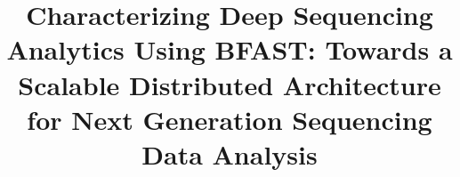 \documentclass{acm_proc_article-sp}
\begin{document}

\newif\ifdraft
\drafttrue                                                                                                   

\ifdraft
 \newcommand{\rananote}[1]{ {\textcolor{blue}    { ***Omer:     #1 }}}
 \newcommand{\jkimnote}[1]{{\textcolor{green}   { ***Joohyun:   #1 }}}
 \newcommand{\jhanote}[1]{  {\textcolor{red}     { ***SJ: #1 }}}
  \newcommand{\smnote}[1]{  {\textcolor{blue}     { ***sharath: #1 }}}
 \newcommand{\todo}[1]{  {\textcolor{red}     { ***TODO: #1 }}}
 \newcommand{\fix}[1]{  {\textcolor{red}     { ***FIX: #1 }}}

\else
 \newcommand{\rananote}[1]{}
 \newcommand{\jkimnote}[1]{}
 \newcommand{\jhanote}[1]{}
 \newcommand{\todo}[1]{  {\textcolor{red}     { ***TODO: #1 }}}
 \newcommand{\fix}[1]{}                                                                                     
\fi

\title{Characterizing Deep Sequencing Analytics Using BFAST: Towards a
  Scalable Distributed Architecture for Next Generation
  Sequencing Data Analysis}


%
%
%
%
%
\end{document}
